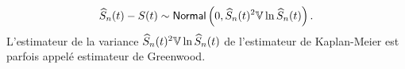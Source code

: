 $$
\widehat{S}_n(t) - S(t)\sim \mathsf{Normal}\left(0,\widehat{S}_n(t)^2\mathbb{V}\ln\widehat{S}_n(t)
\right).
$$
L'estimateur de la variance $\widehat{S}_n(t)^2\mathbb{V}\ln\widehat{S}_n(t)$ de l'estimateur de Kaplan-Meier est parfois appelé estimateur de Greenwood.
